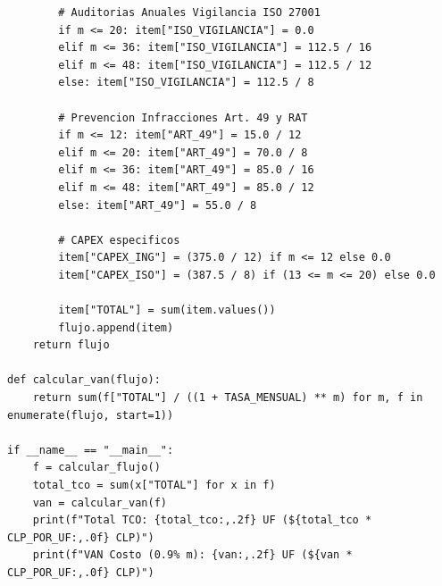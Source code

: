 \begin{verbatim}
        # Auditorias Anuales Vigilancia ISO 27001
        if m <= 20: item["ISO_VIGILANCIA"] = 0.0
        elif m <= 36: item["ISO_VIGILANCIA"] = 112.5 / 16
        elif m <= 48: item["ISO_VIGILANCIA"] = 112.5 / 12
        else: item["ISO_VIGILANCIA"] = 112.5 / 8
        
        # Prevencion Infracciones Art. 49 y RAT
        if m <= 12: item["ART_49"] = 15.0 / 12
        elif m <= 20: item["ART_49"] = 70.0 / 8
        elif m <= 36: item["ART_49"] = 85.0 / 16
        elif m <= 48: item["ART_49"] = 85.0 / 12
        else: item["ART_49"] = 55.0 / 8
        
        # CAPEX especificos
        item["CAPEX_ING"] = (375.0 / 12) if m <= 12 else 0.0
        item["CAPEX_ISO"] = (387.5 / 8) if (13 <= m <= 20) else 0.0
        
        item["TOTAL"] = sum(item.values())
        flujo.append(item)
    return flujo

def calcular_van(flujo):
    return sum(f["TOTAL"] / ((1 + TASA_MENSUAL) ** m) for m, f in enumerate(flujo, start=1))

if __name__ == "__main__":
    f = calcular_flujo()
    total_tco = sum(x["TOTAL"] for x in f)
    van = calcular_van(f)
    print(f"Total TCO: {total_tco:,.2f} UF (${total_tco * CLP_POR_UF:,.0f} CLP)")
    print(f"VAN Costo (0.9% m): {van:,.2f} UF (${van * CLP_POR_UF:,.0f} CLP)")
\end{verbatim}
